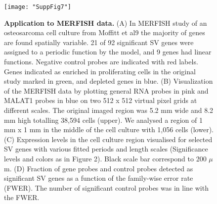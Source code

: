 \begin{figure}
    \centering
    \texttt{[image: "SuppFig7"]}
    \caption[Application to MERFISH data]{\textbf{Application to MERFISH data.} (A) In MERFISH study of an osteosarcoma cell culture from Moffitt et al9  the majority of genes are found spatially variable. 21 of 92 significant SV genes were assigned to a periodic function by the model, and 9 genes had linear functions. Negative control probes are indicated with red labels. Genes indicated as enriched in proliferating cells in the original study marked in green, and depleted genes in blue. (B) Visualization of the MERFISH data by plotting general RNA probes in pink and MALAT1 probes in blue on two 512 x 512 virtual pixel grids at different scales. The original imaged region was 5.2 mm wide and 8.2 mm high totalling 38,594 cells (upper). We analysed a region of 1 mm x 1 mm in the middle of the cell culture with 1,056 cells (lower). (C) Expression levels in the cell culture region visualised for selected SV genes with various fitted periods and length scales (Significance levels and colors as in Figure 2). Black scale bar correspond to 200 \( \mu \)m. (D) Fraction of gene probes and control probes detected as significant SV genes as a function of the family-wise error rate (FWER). The number of significant control probes was in line with the FWER.}
    \label{fig:ss7}
\end{figure}


